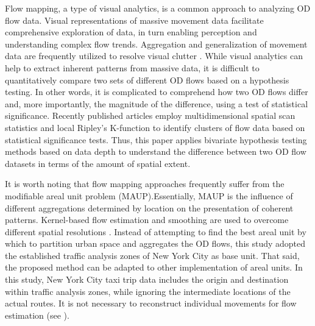 \documentclass[a4paper,UKenglish]{lipics-v2018}
\begin{document}


Flow mapping, a type of visual analytics, is a common approach to analyzing OD flow data. Visual representations of massive movement data facilitate comprehensive exploration of data, in turn enabling perception and understanding complex flow trends.
Aggregation and generalization of movement data are frequently utilized to resolve visual clutter \cite{guo14IEEETVCG}.  %
While visual analytics can help to extract inherent patterns from massive data, it is difficult to quantitatively compare two sets of different OD flows based on a hypothesis testing.
In other words, it is complicated to comprehend how two OD flows differ and, more importantly, the magnitude of the difference, using a test of statistical significance.  Recently published articles employ multidimensional spatial scan statistics  \cite{Gao17IJGIS} and  local Ripley’s K-function \cite{tao16GA} to identify clusters of  flow data based on statistical significance tests. Thus, this paper applies bivariate hypothesis testing methods based on data depth to understand the difference between two OD flow datasets in terms of the amount of spatial extent. 

It is worth noting that flow mapping approaches frequently suffer from the modifiable areal unit problem (MAUP).Essentially, MAUP is the influence of different aggregations determined by location on the presentation of coherent patterns.  Kernel-based flow estimation and smoothing are used to overcome different spatial resolutions \cite{guo14IEEETVCG}. 
Instead of attempting to find the best areal unit by which to partition urban space and aggregates the OD flows, this study adopted the established traffic analysis  zones of New York City as base unit. That said, the proposed method can be adapted to other implementation of areal units. In this study, New York City taxi trip data includes the origin and destination within traffic analysis zones, while ignoring the intermediate locations of the actual routes.
It is not necessary to reconstruct individual movements for flow estimation (see \cite{duckham16ICGIS}).
\end{document}
